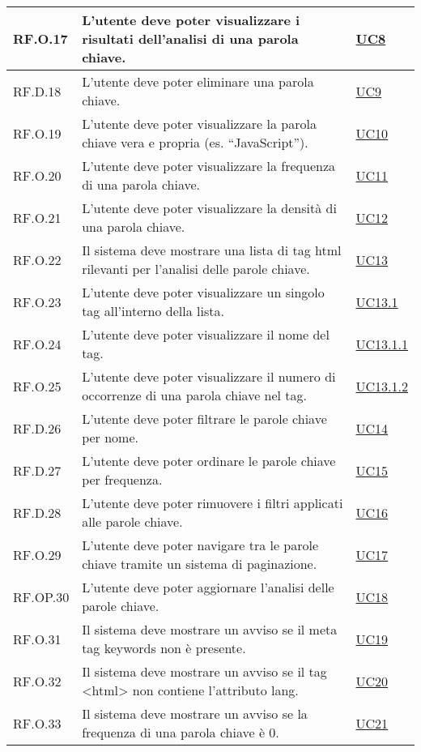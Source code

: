 \begin{tabularx}{\textwidth}{l >{\raggedright\arraybackslash}X l}
\hline
RF.O.17 & L'utente deve poter visualizzare i risultati dell'analisi di una parola chiave. & \hyperref[UC8]{UC8} \\
\hline
RF.D.18 & L'utente deve poter eliminare una parola chiave. & \hyperref[UC9]{UC9} \\
\hline
RF.O.19 & L'utente deve poter visualizzare la parola chiave vera e propria (es. “JavaScript”). & \hyperref[UC10]{UC10} \\
\hline
RF.O.20 & L'utente deve poter visualizzare la frequenza di una parola chiave. & \hyperref[UC11]{UC11} \\
\hline
RF.O.21 & L'utente deve poter visualizzare la densità di una parola chiave. & \hyperref[UC12]{UC12} \\
\hline
RF.O.22 & Il sistema deve mostrare una lista di tag \gls{html} rilevanti per l’analisi delle parole chiave. & \hyperref[UC13]{UC13} \\
\hline
RF.O.23 & L'utente deve poter visualizzare un singolo tag all'interno della lista. & \hyperref[UC13point1]{UC13.1} \\
\hline
RF.O.24 & L'utente deve poter visualizzare il nome del tag. & \hyperref[UC13point1point1]{UC13.1.1} \\
\hline
RF.O.25 & L'utente deve poter visualizzare il numero di occorrenze di una parola chiave nel tag. & \hyperref[UC13point1point2]{UC13.1.2} \\
\hline
RF.D.26 & L'utente deve poter filtrare le parole chiave per nome. & \hyperref[UC14]{UC14} \\
\hline
RF.D.27 & L'utente deve poter ordinare le parole chiave per frequenza. & \hyperref[UC15]{UC15} \\
\hline
RF.D.28 & L'utente deve poter rimuovere i filtri applicati alle parole chiave. & \hyperref[UC16]{UC16} \\
\hline
RF.O.29 & L'utente deve poter navigare tra le parole chiave tramite un sistema di paginazione. & \hyperref[UC17]{UC17} \\
\hline
RF.OP.30 & L'utente deve poter aggiornare l'analisi delle parole chiave. & \hyperref[UC18]{UC18} \\
\hline
RF.O.31 & Il sistema deve mostrare un avviso se il meta tag keywords non è presente. & \hyperref[UC19]{UC19} \\
\hline
RF.O.32 & Il sistema deve mostrare un avviso se il tag <html> non contiene l’attributo lang. & \hyperref[UC20]{UC20} \\
\hline
RF.O.33 & Il sistema deve mostrare un avviso se la frequenza di una parola chiave è 0. & \hyperref[UC21]{UC21} \\

\end{tabularx}

